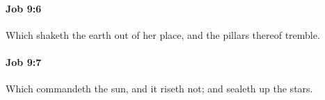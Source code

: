 		\paragraph{Job 9:6} %
			\label{JOB-9-6}

			Which shaketh the earth out of her place, and the pillars thereof tremble.


		\paragraph{Job 9:7} %
			\label{JOB-9-7}

			Which commandeth the sun, and it riseth not; and sealeth up the stars.



